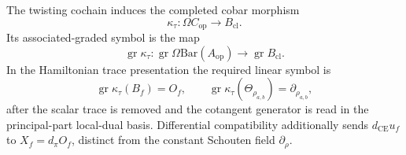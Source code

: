 \begin{defn}
  The twisting cochain induces the completed cobar morphism
  \[
    \kappa_\tau\colon
    \Omega C_{\mathrm{op}}
    \longrightarrow B_{\mathrm{cl}}.
  \]
  Its associated-graded symbol is the map
  \[
    \operatorname{gr}\kappa_\tau\colon
    \operatorname{gr}\Omega\mathrm{Bar}(A_{\mathrm{op}})
    \longrightarrow
    \operatorname{gr}B_{\mathrm{cl}}.
  \]
  In the Hamiltonian trace presentation the required linear symbol is
  \[
    \operatorname{gr}\kappa_\tau(B_f)=O_f,\qquad
    \operatorname{gr}\kappa_\tau(\Theta_{\rho_{a,b}})
      =\partial_{\rho_{a,b}},
  \]
  after the scalar trace is removed and the cotangent generator is read
  in the principal-part local-dual basis.  Differential compatibility
  additionally sends \(d_{\mathrm{CE}}u_f\) to
  \(X_f=d_\pi O_f\), distinct from the constant Schouten field
  \(\partial_\rho\).
\end{defn}


